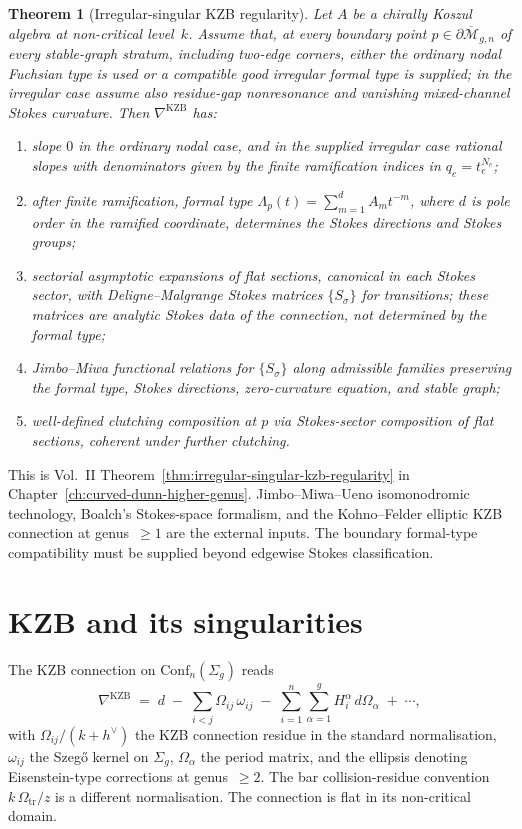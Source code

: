 \documentclass[11pt]{amsart}
\newtheorem{theorem}{Theorem}[section]
\theoremstyle{definition}
\theoremstyle{remark}
\providecommand{\Mbar}{\overline{\mathcal{M}}}
\providecommand{\Conf}{\mathrm{Conf}}
\providecommand{\KZB}{\mathrm{KZB}}
\begin{document}
\begin{theorem}[Irregular-singular KZB regularity]
\label{thm:irregular-singular-kzb-standalone}
Let $A$ be a chirally Koszul algebra at non-critical level~$k$.
Assume that, at every boundary point
$p \in \partial\Mbar_{g,n}$ of every stable-graph stratum, including
two-edge corners, either the ordinary nodal Fuchsian type is used or a
compatible good irregular formal type is supplied; in the irregular
case assume also residue-gap nonresonance and vanishing mixed-channel
Stokes curvature. Then
$\nabla^{\KZB}$ has:
\begin{enumerate}
\item slope \(0\) in the ordinary nodal case, and in the supplied
irregular case rational slopes with denominators given by the finite
ramification indices in \(q_e=t_e^{N_e}\);
\item after finite ramification, formal type
\(\Lambda_p(t)=\sum_{m=1}^d A_m t^{-m}\), where \(d\) is pole order
in the ramified coordinate, determines the Stokes directions and
Stokes groups;
\item sectorial asymptotic expansions of flat sections, canonical
in each Stokes sector, with Deligne--Malgrange Stokes matrices
\(\{S_\sigma\}\) for transitions; these matrices are analytic
Stokes data of the connection, not determined by the formal type;
\item Jimbo--Miwa functional relations for
$\{S_\sigma\}$ along admissible families preserving the formal type,
Stokes directions, zero-curvature equation, and stable graph;
\item well-defined clutching composition at $p$ via Stokes-sector
composition of flat sections, coherent under further clutching.
\end{enumerate}
\end{theorem}

This is Vol.~II Theorem~\ref*{thm:irregular-singular-kzb-regularity}
in Chapter~\ref*{ch:curved-dunn-higher-genus}.
Jimbo--Miwa--Ueno isomonodromic technology, Boalch's Stokes-space
formalism, and the Kohno--Felder elliptic KZB connection at
genus~$\ge 1$ are the external inputs.  The boundary formal-type
compatibility must be supplied beyond edgewise Stokes classification.

\section{KZB and its singularities}

The KZB connection on $\Conf_n(\Sigma_g)$ reads
\[
\nabla^{\KZB}
\;=\; d
\;-\; \sum_{i<j} \Omega_{ij}\,\omega_{ij}
\;-\; \sum_{i=1}^{n}\sum_{\alpha=1}^{g} H_i^\alpha\,d\Omega_\alpha
\;+\; \cdots,
\]
with $\Omega_{ij}/(k+h^\vee)$ the KZB connection residue in the
standard normalisation,
$\omega_{ij}$ the Szeg\H{o} kernel on $\Sigma_g$, $\Omega_\alpha$ the
period matrix, and the ellipsis denoting Eisenstein-type corrections
at genus~$\ge 2$. The bar collision-residue convention
\(k\,\Omega_{\mathrm{tr}}/z\) is a different normalisation. The connection is flat
in its non-critical domain.
\end{document}
